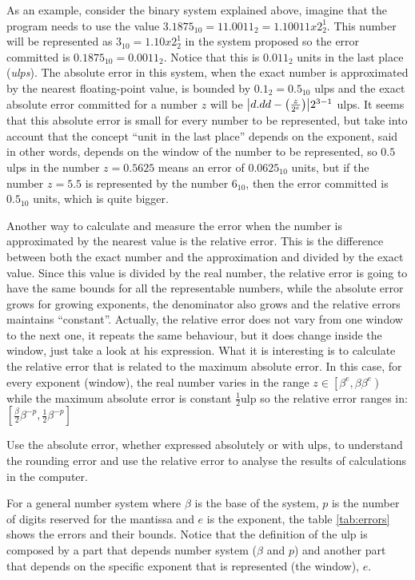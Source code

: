 As an example, consider the binary system explained above, imagine that the program needs to use the value $3.1875_{10} = 11.0011_2 = 
1.10011x2^1_2$. This number will be represented as $3_{10} = 1.10x2^1_2$ in the system proposed so the error committed is $0.1875_{10} = 
0.0011_2$. Notice that this is $0.011_2$ units in the last place (\textit{ulps}). The absolute error in this system, when the exact number is 
approximated by the nearest floating-point value, is bounded by $0.1_2 = 0.5_{10}$ ulps and the exact absolute error committed for a number 
$z$ will be $\abs{d.dd-\left(\frac{z}{2^e}\right)} 2^{3-1}$ ulps. It seems that this absolute error is small for every number to be 
represented, but take into account that the concept ``unit in the last place'' depends on the exponent, said in other words, depends on the 
window of the number to be represented, so $0.5$ ulps in the number $z = 0.5625$ means an error of $0.0625_{10}$ units, but if the number $z 
= 5.5$ is represented by the number $6_{10}$, then the error committed is $0.5_{10}$ units, which is quite bigger. 

Another way to calculate and measure the error when the number is approximated by the nearest value is the relative error. This is the 
difference between both the exact number and the approximation and divided by the exact value. Since this value is divided by the real 
number, the relative error is going to have the same bounds for all the representable numbers, while the absolute error grows for growing 
exponents, the denominator also grows and the relative errors maintains ``constant''. Actually, the relative error does not vary from one 
window to the next one, it repeats the same behaviour, but it does change inside the window, just take a look at his expression. What it is 
interesting is to calculate the relative error that is related to the maximum absolute error. In this case, for every exponent (window), the 
real number varies in the range $z \in \left[\beta^e, \beta \beta^e\right)$ while the maximum absolute error is constant 
$\frac{1}{2}\textrm{ulp}$ so the relative error ranges in: $\left[\frac{\beta}{2}\beta^{-p}, \frac{1}{2}\beta^{-p} \right]$

\begin{IN}
    Use the absolute error, whether expressed absolutely or with ulps, to understand the rounding error and use the relative error to analyse 
    the results of calculations in the computer.
\end{IN}  

For a general number system where $\beta$ is the base of the system, $p$ is the number of digits reserved for the mantissa and $e$ is the 
exponent, the table \ref{tab:errors} shows the errors and their bounds. Notice that the definition of the ulp is composed by a part that 
depends number system ($\beta$ and $p$) and another part that depends on the specific exponent that is represented (the window), $e$. 

